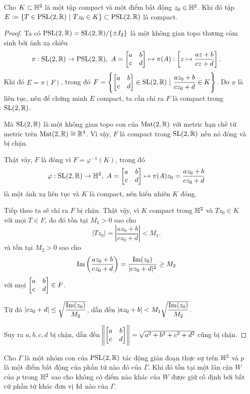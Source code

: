 \begin{prop}\label{prop 3.2.16}
    Cho $K \subset \mathbb{H}^2$ là một tập compact và một điểm bất động $z_0 \in \mathbb{H}^2$. Khi đó tập $E:= \{T \in \operatorname{PSL}(2,\mathbb{R})~|~Tz_0 \in K\} \subset \operatorname{PSL}(2,\mathbb{R})$ là compact.
\end{prop}
\begin{proof}

    Ta có $\operatorname{PSL}(2,\mathbb{R}) = \operatorname{SL}(2,\mathbb{R})/\{\pm I_2\}$ là một không gian topo thương cảm sinh bởi ánh xạ chiếu \[\pi: \operatorname{SL}(2,\mathbb{R}) \to \operatorname{PSL}(2,\mathbb{R}),~A = \begin{bmatrix} a & b \\ c & d \\ \end{bmatrix} \mapsto \pi(A) :\left[ z\mapsto \dfrac{az+b}{cz+d}\right].\] Khi đó $E = \pi(F)$, trong đó $F = \left\{\begin{bmatrix} a & b \\ c & d \\ \end{bmatrix} \in \operatorname{SL}(2,\mathbb{R})~|~\dfrac{az_0+b}{cz_0+d} \in K\right\}$. Do $\pi$ là liên tục, nên để chứng minh $E$ compact, ta cần chỉ ra $F$ là compact trong $\operatorname{SL}(2,\mathbb{R})$. 
    
    Mà $\operatorname{SL}(2,\mathbb{R})$ là một không gian topo con của $\operatorname{Mat}(2,\mathbb{R})$ với metric hạn chế từ metric trên $\operatorname{Mat}(2,\mathbb{R}) \cong \mathbb{R}^4$. Vì vậy, $F$ là compact trong $\operatorname{SL}(2,\mathbb{R})$ nếu nó đóng và bị chặn.

    Thật vây, $F$ là đóng vì $F = \varphi^{-1}(K)$, trong đó 
    \[\varphi: \operatorname{SL}(2,\mathbb{R}) \to \mathbb{H}^2,~A = \begin{bmatrix} a & b \\ c & d \\ \end{bmatrix} \mapsto \pi(A)z_0 = \dfrac{az_0+b}{cz_0+d}\]
    là một ánh xạ liên tục và $K$ là compact, nên hiển nhiên $K$ đóng.

    Tiếp theo ta sẽ chỉ ra $F$ bị chặn. Thật vậy, vì $K$ compact trong $\mathbb{H}^2$ 
    và $Tz_0 \in K$ với mọi $T \in F$, do đó tồn tại $M_1>0$ sao cho
    \[|Tz_0|= \left|\dfrac{az_0+b}{cz_0+d}\right|< M_1.\]
    và tồn tại $M_2>0$ sao cho 
    \[\operatorname{Im}\left(\dfrac{az_0+b}{cz_0+d}\right) = \dfrac{\operatorname{Im}(z_0)}{|cz_0+d|^2}\geq M_2\]
    với mọi $\begin{bmatrix} a & b \\ c & d \\ \end{bmatrix} \in F$.
    
    Từ đó $|cz_0+d| \leq \sqrt{\dfrac{\operatorname{Im}(z_0)}{M_2}}$, dẫn đến $|az_0+b|<M_1\sqrt{\dfrac{\operatorname{Im}(z_0)}{M_2}}$. 
    
    Suy ra $a,b,c,d$ bị chặn, dẫn đến $\norm{\begin{bmatrix} a & b \\ c & d \\ \end{bmatrix}} = \sqrt{a^2+b^2+c^2+d^2}$ cũng   bị chặn.
\end{proof}
\begin{lem}\label{lem 3.2.17}
    Cho $\Gamma$ là một nhóm con của $\operatorname{PSL}(2,\mathbb{R})$ tác động gián đoạn thực sự trên $\mathbb{H}^2$ và $p$ là một điểm bất động của phần tử nào đó của $\Gamma$. Khi đó tồn tại một lân cận $W$ của $p$ trong $\mathbb{H}^2$ sao cho không có điểm nào khác của $W$ được giữ cố định bởi bất cứ phần tử khác đơn vị $\operatorname{Id}$ nào của $\Gamma$.
\end{lem}
